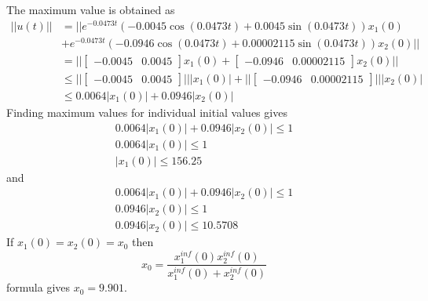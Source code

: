 The maximum value is obtained as
\begin{equation}
    \begin{split}
        ||u(t)||&=||e^{-0.0473t}(-0.0045\cos(0.0473t)+0.0045\sin(0.0473t))x_1(0)\\
        &+e^{-0.0473t}(-0.0946\cos(0.0473t)+0.00002115\sin(0.0473t))x_2(0)||\\
        &=||\begin{bmatrix}-0.0045& 0.0045\end{bmatrix}x_1(0)+\begin{bmatrix}-0.0946& 0.00002115\end{bmatrix}x_2(0)||\\
        &\leq ||\begin{bmatrix}-0.0045& 0.0045\end{bmatrix}|| |x_1(0)|+||\begin{bmatrix}-0.0946& 0.00002115\end{bmatrix}|| |x_2(0)|\\
        &\leq 0.0064|x_1(0)|+0.0946 |x_2(0)|
    \end{split}
\end{equation}
Finding maximum values for individual initial values gives
\begin{equation}
\begin{split}
    0.0064|x_1(0)|+0.0946 |x_2(0)|\leq 1\\
    0.0064|x_1(0)|\leq 1\\
    |x_1(0)|\leq 156.25
\end{split}
\end{equation}
and 
\begin{equation}
    \begin{split}
        0.0064|x_1(0)|+0.0946 |x_2(0)|\leq 1\\
        0.0946 |x_2(0)|\leq 1\\
        0.0946 |x_2(0)|\leq 10.5708
    \end{split}
\end{equation}
If $x_1(0)=x_2(0)=x_0$ then
\begin{equation}
    x_0=\frac{x_1^{inf}(0)x_2^{inf}(0)}{x_1^{inf}(0)+x_2^{inf}(0)}
\end{equation}
formula gives $x_0=9.901$.




